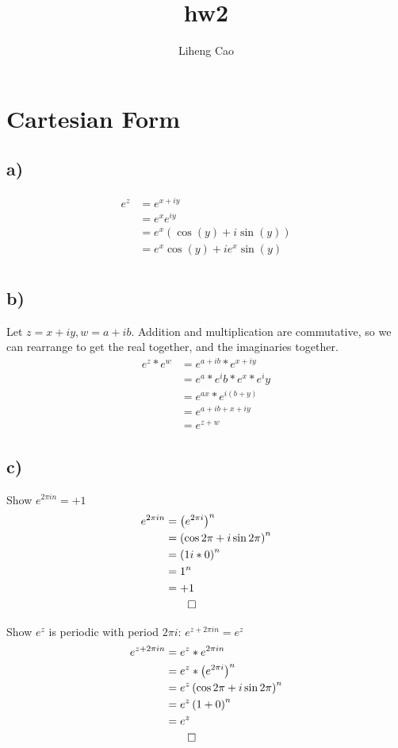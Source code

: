 \documentclass[12pt]{article}
\title{hw2}
\author{Liheng Cao}
\begin{document}
\maketitle

\section{Cartesian Form}
\subsection{a)}
\begin{align*}
	e^z &= e^{x+iy}\\
	&= e^x e^{iy}\\
	&= e^x \left( \cos{(y)} + i\sin{(y)}\right) \\
	&= e^x \cos{(y)} + i e^x \sin{(y)}\\
\end{align*}


\subsection{b)}

Let $z = x+iy, w = a+ib$. Addition and multiplication are commutative, so we can rearrange to get the real together, and the imaginaries together.
\begin{align*}
	e^z * e^w &= e^{a+ib} * e ^{x+iy}\\
	&= e^a * e^ib * e^x * e^iy\\
	&= e^{ax} * e^{i(b+y)}\\
	&= e^{a + ib + x + iy}\\
	&= e^{z+w}
\end{align*}

\subsection{c)}
Show $e^{2\pi i n} = +1$
\begin{align*}
	e^{2\pi i n} &= \left( e^{2\pi i}\right)^n\\
	&= \left( \cos{2\pi} + i\sin{2\pi}\right)^n\\
	&= \left( 1  i * 0\right)^n\\
	&= 1^n\\
	&= +1\\
	&\qed
\end{align*}

Show $e^z$ is periodic with period $2\pi i$: $e^{z+2\pi i n} = e^z$
\begin{align*}
	e^{z + 2\pi i n} &= e^z * e^{2\pi i n}\\
	&= e^z * \left(e^{2\pi i}\right)^n\\
	&= e^z \left(\cos{2\pi} + i\sin{2\pi}\right)^n\\
	&= e^z \left(1 + 0\right)^n\\
	&= e^z\\
	&\qed
\end{align*}
\end{document}
